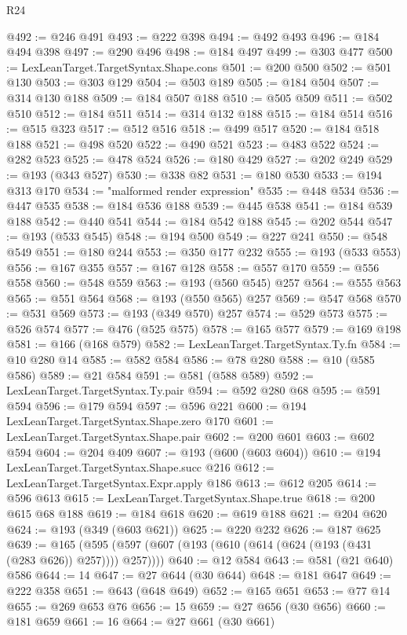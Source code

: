 \begin{lexlean}{R24}
\begin{coremodule}
@492 := @246 @491
@493 := @222 @398
@494 := @492 @493
@496 := @184 @494 @398
@497 := @290 @496
@498 := @184 @497
@499 := @303 @477
@500 := LexLeanTarget.TargetSyntax.Shape.cons
@501 := @200 @500
@502 := @501 @130
@503 := @303 @129
@504 := @503 @189
@505 := @184 @504
@507 := @314 @130 @188
@509 := @184 @507 @188
@510 := @505 @509
@511 := @502 @510
@512 := @184 @511
@514 := @314 @132 @188
@515 := @184 @514
@516 := @515 @323
@517 := @512 @516
@518 := @499 @517
@520 := @184 @518 @188
@521 := @498 @520
@522 := @490 @521
@523 := @483 @522
@524 := @282 @523
@525 := @478 @524
@526 := @180 @429
@527 := @202 @249
@529 := @193 (@343 @527)
@530 := @338 @82
@531 := @180 @530
@533 := @194 @313 @170
@534 := "malformed render expression"
@535 := @448 @534
@536 := @447 @535
@538 := @184 @536 @188
@539 := @445 @538
@541 := @184 @539 @188
@542 := @440 @541
@544 := @184 @542 @188
@545 := @202 @544
@547 := @193 (@533 @545)
@548 := @194 @500
@549 := @227 @241
@550 := @548 @549
@551 := @180 @244
@553 := @350 @177 @232
@555 := @193 (@533 @553)
@556 := @167 @355
@557 := @167 @128
@558 := @557 @170
@559 := @556 @558
@560 := @548 @559
@563 := @193 (@560 @545) @257
@564 := @555 @563
@565 := @551 @564
@568 := @193 (@550 @565) @257
@569 := @547 @568
@570 := @531 @569
@573 := @193 (@349 @570) @257
@574 := @529 @573
@575 := @526 @574
@577 := @476 (@525 @575)
@578 := @165 @577
@579 := @169 @198
@581 := @166 (@168 @579)
@582 := LexLeanTarget.TargetSyntax.Ty.fn
@584 := @10 @280 @14
@585 := @582 @584
@586 := @78 @280
@588 := @10 (@585 @586)
@589 := @21 @584
@591 := @581 (@588 @589)
@592 := LexLeanTarget.TargetSyntax.Ty.pair
@594 := @592 @280 @68
@595 := @591 @594
@596 := @179 @594
@597 := @596 @221
@600 := @194 LexLeanTarget.TargetSyntax.Shape.zero @170
@601 := LexLeanTarget.TargetSyntax.Shape.pair
@602 := @200 @601
@603 := @602 @594
@604 := @204 @409
@607 := @193 (@600 (@603 @604))
@610 := @194 LexLeanTarget.TargetSyntax.Shape.succ @216
@612 := LexLeanTarget.TargetSyntax.Expr.apply @186
@613 := @612 @205
@614 := @596 @613
@615 := LexLeanTarget.TargetSyntax.Shape.true
@618 := @200 @615 @68 @188
@619 := @184 @618
@620 := @619 @188
@621 := @204 @620
@624 := @193 (@349 (@603 @621))
@625 := @220 @232
@626 := @187 @625
@639 := @165 (@595 (@597 (@607 (@193 (@610 (@614 (@624 (@193 (@431 (@283 @626)) @257)))) @257))))
@640 := @12 @584
@643 := @581 (@21 @640) @586
@644 := 14
@647 := @27 @644 (@30 @644)
@648 := @181 @647
@649 := @222 @358
@651 := @643 (@648 @649)
@652 := @165 @651
@653 := @77 @14
@655 := @269 @653 @76
@656 := 15
@659 := @27 @656 (@30 @656)
@660 := @181 @659
@661 := 16
@664 := @27 @661 (@30 @661)

\end{coremodule}
\end{lexlean}
